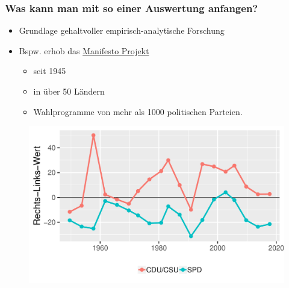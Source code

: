 \documentclass{beamer}
\begin{document}
\begin{frame}
    \frametitle{Was kann man mit so einer Auswertung anfangen?}
    \begin{itemize}
        \item Grundlage gehaltvoller empirisch-analytische Forschung
        \item Bspw. erhob das \href{https://manifesto-project.wzb.eu/}{Manifesto Projekt}
        \begin{itemize}
            \item seit 1945
            \item in über 50 Ländern
            \item Wahlprogramme von mehr als 1000 politischen Parteien.
        \end{itemize}
    \end{itemize}
    \begin{figure}
        \centering
        \includegraphics[scale = .4]{./centerPartiesDE.pdf}
    \end{figure}
\end{frame}
\end{document}

